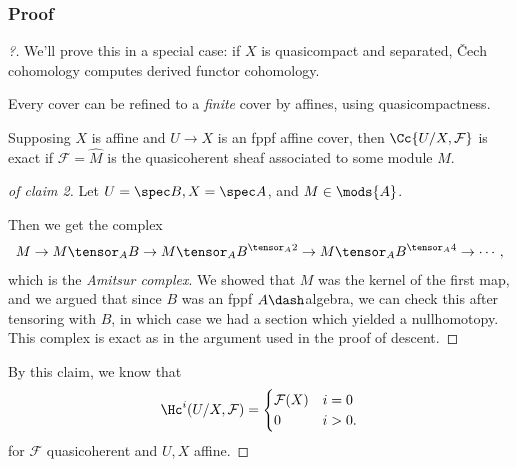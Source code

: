 \hypertarget{proof}{%
\subsubsection{Proof}\label{proof}}

\begin{proof}[?]

We'll prove this in a special case: if \(X\) is quasicompact and
separated, Čech cohomology computes derived functor cohomology.

\begin{claim}[1]

Every cover can be refined to a \emph{finite} cover by affines, using
quasicompactness.

\end{claim}

\begin{claim}[2]

Supposing \(X\) is affine and \(U\to X\) is an fppf affine cover, then
\(\Cc{U/X, \mathcal{F}}\) is exact if \(\mathcal{F} = \hat M\) is the
quasicoherent sheaf associated to some module \(M\).

\end{claim}

\begin{proof}[of claim 2]

Let \(U=\spec B, X = \spec A\), and \(M\in \mods{A}\).

Then we get the complex
\begin{align*}  
M\to
M\tensor_A B \to 
M\tensor_A B^{\tensor_A 2} \to 
M\tensor_A B^{\tensor_A 4} \to 
\cdots
,\end{align*} which is the \emph{Amitsur complex}. We showed that \(M\)
was the kernel of the first map, and we argued that since \(B\) was an
fppf \(A\dash\)algebra, we can check this after tensoring with \(B\), in
which case we had a section which yielded a nullhomotopy. This complex
is exact as in the argument used in the proof of descent.

\end{proof}

By this claim, we know that
\begin{align*}  
\Hc^{i}(U/X, \mathcal{F}) = 
\begin{cases}
\mathcal{F}(X) & i = 0 \\
0              & i>0.
\end{cases}
\end{align*} for \(\mathcal{F}\) quasicoherent and \(U, X\) affine.


\end{proof}
